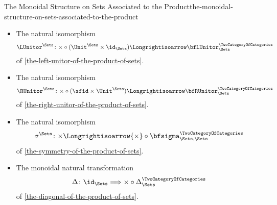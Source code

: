 \begin{proposition}{The Monoidal Structure on Sets Associated to the Product}{the-monoidal-structure-on-sets-associated-to-the-product}
\begin{itemize}
        \item{}The natural isomorphism
            \[
                \LUnitor^{\Sets}%
                \colon%
                {\times}\circ{(\Unit^{\Sets}\times\id_{\Sets})}
                \Longrightisoarrow
                \bfLUnitor^{\TwoCategoryOfCategories}_{\Sets}
            \]
            of \cref{the-left-unitor-of-the-product-of-sets}.
        \item{}The natural isomorphism
            \[
                \RUnitor^{\Sets}%
                \colon%
                {\times}\circ{({\sfid}\times{\Unit^{\Sets}})}%
                \Longrightisoarrow%
                \bfRUnitor^{\TwoCategoryOfCategories}_{\Sets}%
            \]
            of \cref{the-right-unitor-of-the-product-of-sets}.
        \item{}The natural isomorphism
            \[
                \sigma^{\Sets}
                \colon
                {\times}
                \Longrightisoarrow
                {\times}\circ{\bfsigma^{\TwoCategoryOfCategories}_{\Sets,\Sets}}
            \]
            of \cref{the-symmetry-of-the-product-of-sets}.
        \item{}The monoidal natural transformation
            \[
                \Delta%
                \colon%
                \id_{\Sets}%
                \Longrightarrow%
                \times\circ\Delta^{\TwoCategoryOfCategories}_{\Sets}%
            \]
            of \cref{the-diagonal-of-the-product-of-sets}.
    \end{itemize}
\end{proposition}

